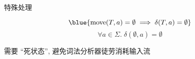\begin{frame}{}
  \begin{center}
    特殊处理 

    \[
      \blue{\text{move}(T, a) = \emptyset
        \implies \delta(T, a) = \emptyset}
    \]
    \[
      \forall a \in \Sigma.\; \delta(\emptyset, a) = \emptyset
    \]

    需要 ``死状态'', 避免词法分析器徒劳消耗输入流
  \end{center}
\end{frame}
